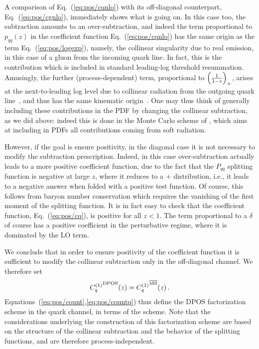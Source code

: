 A comparison of Eq.~(\ref{eq:pos/cqnlo}) with its off-diagonal counterpart,
Eq.~(\ref{eq:pos/cgnlo}), immediately shows what is going on. In this
case too, the \msbar{} subtraction amounts to an over-subtraction, and
indeed the term proportional to $p_{qq}(z)$ in the coefficient
function Eq.~(\ref{eq:pos/cqnlo}) has the same origin as the term
Eq.~(\ref{eq:pos/logexp}), namely, the collinear singularity due to real
emission, in this case of a gluon from the incoming quark line. In
fact,  this is the contribution which is included in standard
leading-log threshold resummation. Amusingly, the further
(process-dependent)
term, proportional
to ${ \left( \frac{1}{1-z} \right)_+ }$, arises at the next-to-leading log level due to collinear
radiation from the outgoing quark line~\cite{Catani:1989ne}, and thus has
the same kinematic origin~\cite{Forte:2002ni}.
One may thus think of generally including these contributions in the
PDF by changing the collinear subtraction, as we did above: indeed
this is done in the Monte Carlo scheme of
\cite{Jadach:2016acv}, which aims at including in PDFs
all contributions coming from soft radiation.


However, if the goal is ensure positivity, in the diagonal case
it is not necessary to
modify the \msbar{}  subtraction prescription. Indeed,
in this case over-subtraction actually leads to a more positive
coefficient function, due to the fact that the $P_{qq}$ splitting
function  is negative at large $z$, where it reduces to a $+$
distribution,
i.e., it leads to a negative answer
when folded with a positive test function. Of course, this follows from
baryon number conservation which requires the vanishing of the first
moment of the splitting function. It is in fact easy to check that the
\msbar{} coefficient function, Eq.~(\ref{eq:pos/cq}), is positive for all
$z<1$. The  term proportional to a $\delta$ of course has a positive
coefficient in the perturbative regime, where it is dominated by the
LO term.

We conclude that in order to ensure positivity of the coefficient
function it is sufficient to modify the collinear subtraction only in the
off-diagonal channel. We therefore set
\begin{align}\label{eq:pos/countq}
   {C_{q}^{(1)}}^{\textrm{DPOS}}(z)=  {C_{q}^{(1)}}^{{\overline{\textrm{MS}}}}(z) \,.
\end{align}
Equations~(\ref{eq:pos/count},\ref{eq:pos/countq}) thus define the DPOS
factorization scheme in the quark channel, in terms of the \msbar{} scheme.
Note that the considerations underlying the construction of this
factorization scheme are based on the
structure of the collinear subtraction and the behavior of the
splitting functions, and are therefore process-independent.

